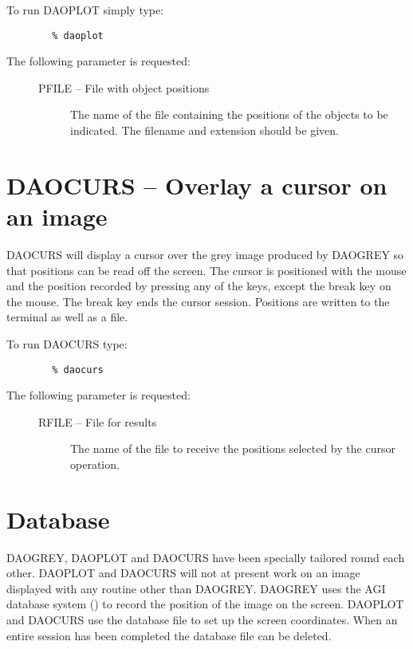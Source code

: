 To run DAOPLOT simply type:

\begin{verbatim}
        % daoplot
\end{verbatim}

The following parameter is requested:

\begin{description}
\item[\mbox{}]\mbox{}
\begin{description}
\item[PFILE -- File with object positions]
The name of the file containing the positions of the objects to be indicated.
The filename and extension should be given.
\end{description}
\end{description}

\section{DAOCURS -- Overlay a cursor on an image}
\label{sec:daocurs}

DAOCURS will display a cursor over the grey image produced by DAOGREY so that
positions can be read off the screen. The cursor is positioned with the mouse and
the position recorded by pressing any of the keys, except the break key on the
mouse. The break key ends the cursor session. Positions are written to the terminal
as well as a file. 

To run DAOCURS type:
\begin{verbatim}
        % daocurs
\end{verbatim}

The following parameter is requested:

\begin{description}
\item[\mbox{}]\mbox{}
\begin{description}
\item[RFILE -- File for results]  
The name of the file to receive the positions selected by the cursor operation.
\end{description}
\end{description}

\section{Database}
\label{sec:database}

DAOGREY, DAOPLOT and DAOCURS have been specially tailored round each other. DAOPLOT
and DAOCURS will not at present work on an image displayed with any routine other
than DAOGREY. DAOGREY uses the AGI database system () to
record the position of the image on the screen. DAOPLOT and DAOCURS use the
database file to set up the screen coordinates. When an entire session has been
completed the database file can be deleted. 






